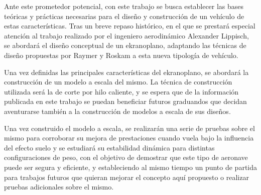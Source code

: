 
Ante este prometedor potencial, con este trabajo se busca establecer las bases teóricas y prácticas necesarias para el diseño y construcción de un vehículo de estas características.  Tras un breve repaso histórico, en el que se prestará especial atención al trabajo realizado por el ingeniero aerodinámico Alexander Lippisch, se abordará el diseño conceptual de un ekranoplano, adaptando las técnicas de diseño propuestas por Raymer\cite{ref:raymer}  y Roskam\cite{ref:roskam} a esta nueva tipología de vehículo.

Una vez definidas las principales características del ekranoplano, se abordará la construcción de un modelo a escala del mismo. La técnica de construcción utilizada será la de corte por hilo caliente, y se espera que de la información publicada en este trabajo se puedan beneficiar futuros graduandos que decidan aventurarse también a la construcción de modelos a escala de sus diseños.

Una vez construido el modelo a escala, se realizarán una serie de pruebas sobre el mismo para corroborar su mejora de prestaciones cuando vuela bajo la influencia del efecto suelo y se estudiará su estabilidad dinámica para distintas configuraciones de peso, con el objetivo de demostrar que este tipo de aeronave puede ser segura y eficiente, y estableciendo al mismo tiempo un punto de partida para trabajos futuros que quieran mejorar el concepto aquí propuesto o realizar pruebas adicionales sobre el mismo.
